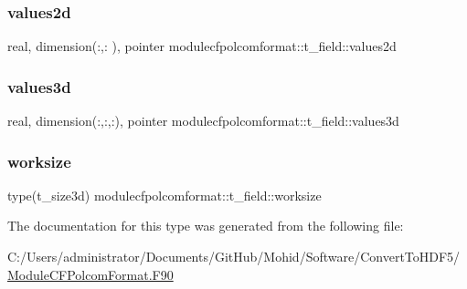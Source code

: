 \subsubsection{\texorpdfstring{values2d}{values2d}}
{\footnotesize\ttfamily real, dimension(\+:,\+:  ), pointer modulecfpolcomformat\+::t\+\_\+field\+::values2d\hspace{0.3cm}{\ttfamily [private]}}

\mbox{\label{structmodulecfpolcomformat_1_1t__field_a8f93352dd274b4348fe21082733c8ba9}} 
\subsubsection{\texorpdfstring{values3d}{values3d}}
{\footnotesize\ttfamily real, dimension(\+:,\+:,\+:), pointer modulecfpolcomformat\+::t\+\_\+field\+::values3d\hspace{0.3cm}{\ttfamily [private]}}

\mbox{\label{structmodulecfpolcomformat_1_1t__field_aa5914a92f441796d7ce2c111cff0e2bf}} 
\subsubsection{\texorpdfstring{worksize}{worksize}}
{\footnotesize\ttfamily type(t\+\_\+size3d) modulecfpolcomformat\+::t\+\_\+field\+::worksize\hspace{0.3cm}{\ttfamily [private]}}



The documentation for this type was generated from the following file\+:\begin{DoxyCompactItemize}
\item 
C\+:/\+Users/administrator/\+Documents/\+Git\+Hub/\+Mohid/\+Software/\+Convert\+To\+H\+D\+F5/\mbox{\hyperlink{_module_c_f_polcom_format_8_f90}{Module\+C\+F\+Polcom\+Format.\+F90}}\end{DoxyCompactItemize}
